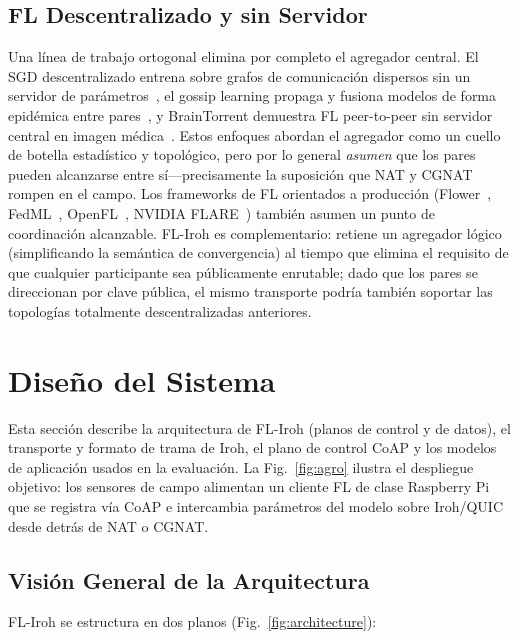 \documentclass[journal]{IEEEtran}
\begin{document}
\subsection{FL Descentralizado y sin Servidor}

Una línea de trabajo ortogonal elimina por completo el agregador central. El SGD descentralizado entrena sobre grafos de comunicación dispersos sin un servidor de parámetros~\cite{lian2017}, el gossip learning propaga y fusiona modelos de forma epidémica entre pares~\cite{hegedus2019}, y BrainTorrent demuestra FL peer-to-peer sin servidor central en imagen médica~\cite{roy2019braintorrent}. Estos enfoques abordan el agregador como un cuello de botella estadístico y topológico, pero por lo general \emph{asumen} que los pares pueden alcanzarse entre sí---precisamente la suposición que NAT y CGNAT rompen en el campo. Los frameworks de FL orientados a producción (Flower~\cite{flower2022}, FedML~\cite{fedml2020}, OpenFL~\cite{openfl2022}, NVIDIA FLARE~\cite{flare2022}) también asumen un punto de coordinación alcanzable. FL-Iroh es complementario: retiene un agregador lógico (simplificando la semántica de convergencia) al tiempo que elimina el requisito de que cualquier participante sea públicamente enrutable; dado que los pares se direccionan por clave pública, el mismo transporte podría también soportar las topologías totalmente descentralizadas anteriores.

\section{Diseño del Sistema}
\label{sec:system}

Esta sección describe la arquitectura de FL-Iroh (planos de control y de datos), el transporte y formato de trama de Iroh, el plano de control CoAP y los modelos de aplicación usados en la evaluación. La Fig.~\ref{fig:agro} ilustra el despliegue objetivo: los sensores de campo alimentan un cliente FL de clase Raspberry Pi que se registra vía CoAP e intercambia parámetros del modelo sobre Iroh/QUIC desde detrás de NAT o CGNAT.

\subsection{Visión General de la Arquitectura}

FL-Iroh se estructura en dos planos (Fig.~\ref{fig:architecture}):
\end{document}
